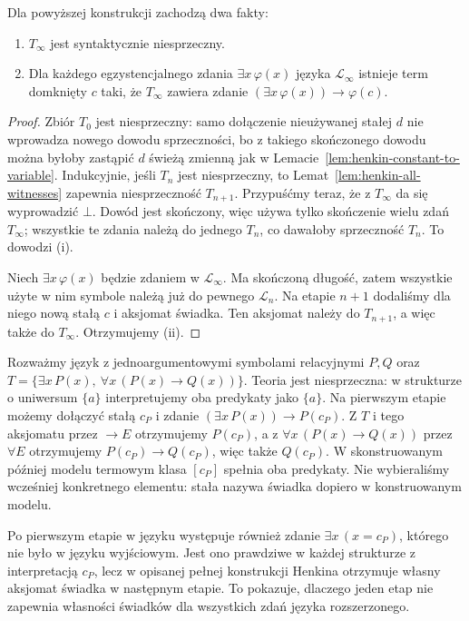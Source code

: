 \begin{twierdzenie}\label{thm:henkin-chain-properties}
Dla powyższej konstrukcji zachodzą dwa fakty:
\begin{enumerate}[label=(\roman*)]
\item $T_{\infty}$ jest syntaktycznie niesprzeczny.
\item Dla każdego egzystencjalnego zdania $\exists x\,\varphi(x)$ języka $\mathcal L_{\infty}$ istnieje term domknięty $c$ taki, że $T_{\infty}$ zawiera zdanie $(\exists x\,\varphi(x))\to\varphi(c)$.
\end{enumerate}
\end{twierdzenie}
\begin{proof}
Zbiór $T_0$ jest niesprzeczny: samo dołączenie nieużywanej stałej $d$ nie wprowadza nowego dowodu sprzeczności, bo z takiego skończonego dowodu można byłoby zastąpić $d$ świeżą zmienną jak w Lemacie~\ref{lem:henkin-constant-to-variable}. Indukcyjnie, jeśli $T_n$ jest niesprzeczny, to Lemat~\ref{lem:henkin-all-witnesses} zapewnia niesprzeczność $T_{n+1}$. Przypuśćmy teraz, że z $T_{\infty}$ da się wyprowadzić $\bot$. Dowód jest skończony, więc używa tylko skończenie wielu zdań $T_{\infty}$; wszystkie te zdania należą do jednego $T_n$, co dawałoby sprzeczność $T_n$. To dowodzi (i).

Niech $\exists x\,\varphi(x)$ będzie zdaniem w $\mathcal L_{\infty}$. Ma skończoną długość, zatem wszystkie użyte w nim symbole należą już do pewnego $\mathcal L_n$. Na etapie $n+1$ dodaliśmy dla niego nową stałą $c$ i aksjomat świadka. Ten aksjomat należy do $T_{n+1}$, a więc także do $T_{\infty}$. Otrzymujemy (ii).
\end{proof}

\begin{przyklad}
Rozważmy język z jednoargumentowymi symbolami relacyjnymi $P,Q$ oraz
$T=\{\exists x\,P(x),\ \forall x\,(P(x)\to Q(x))\}$.
Teoria jest niesprzeczna: w strukturze o uniwersum $\{a\}$ interpretujemy oba predykaty jako $\{a\}$.
Na pierwszym etapie możemy dołączyć stałą $c_P$ i zdanie
$(\exists x\,P(x))\to P(c_P)$. Z $T$ i tego aksjomatu przez $\to E$
otrzymujemy $P(c_P)$, a z $\forall x\,(P(x)\to Q(x))$ przez $\forall E$ otrzymujemy
$P(c_P)\to Q(c_P)$, więc także $Q(c_P)$.
W skonstruowanym później modelu termowym klasa $[c_P]$ spełnia oba predykaty.
Nie wybieraliśmy wcześniej konkretnego elementu: stała nazywa świadka dopiero w konstruowanym modelu.

Po pierwszym etapie w języku występuje również zdanie
$\exists x\,(x=c_P)$, którego nie było w języku wyjściowym.
Jest ono prawdziwe w każdej strukturze z interpretacją $c_P$, lecz w opisanej pełnej konstrukcji Henkina otrzymuje własny aksjomat świadka w następnym etapie.
To pokazuje, dlaczego jeden etap nie zapewnia własności świadków dla wszystkich zdań języka rozszerzonego.
\end{przyklad}

